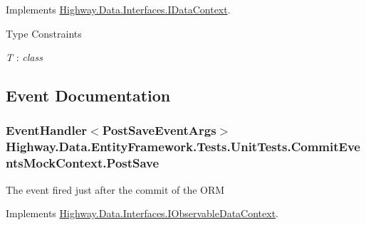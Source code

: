 Implements \hyperlink{interface_highway_1_1_data_1_1_interfaces_1_1_i_data_context_a54acc7026404f8426c0e1efe6accaf26}{Highway.\-Data.\-Interfaces.\-I\-Data\-Context}.

\begin{Desc}
\item[Type Constraints]\begin{description}
\item[{\em T} : {\em class}]\end{description}
\end{Desc}


\subsection{Event Documentation}
\hypertarget{class_highway_1_1_data_1_1_entity_framework_1_1_tests_1_1_unit_tests_1_1_commit_events_mock_context_acc706858c7a83909f5ec24ae9829add8}{
\subsubsection[{Post\-Save}]{\setlength{\rightskip}{0pt plus 5cm}Event\-Handler$<${\bf Post\-Save\-Event\-Args}$>$ Highway.\-Data.\-Entity\-Framework.\-Tests.\-Unit\-Tests.\-Commit\-Events\-Mock\-Context.\-Post\-Save}}\label{class_highway_1_1_data_1_1_entity_framework_1_1_tests_1_1_unit_tests_1_1_commit_events_mock_context_acc706858c7a83909f5ec24ae9829add8}


The event fired just after the commit of the O\-R\-M 



Implements \hyperlink{interface_highway_1_1_data_1_1_interfaces_1_1_i_observable_data_context_a1978b914f7b94a37a6e86f3314326ca9}{Highway.\-Data.\-Interfaces.\-I\-Observable\-Data\-Context}.


